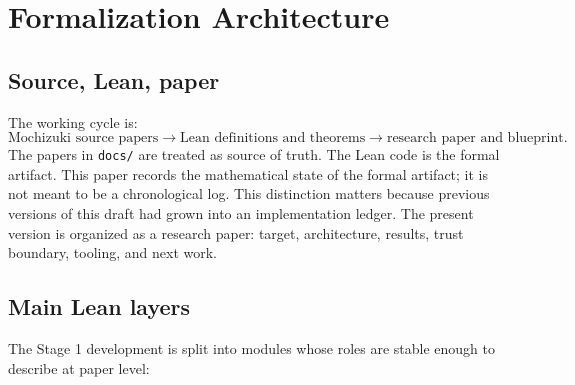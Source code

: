 \documentclass[11pt]{article}
\newcommand{\Lean}{Lean}
\theoremstyle{plain}
\theoremstyle{definition}
\theoremstyle{remark}
\begin{document}
\section{Formalization Architecture}

\subsection{Source, Lean, paper}

The working cycle is:
\[
\text{Mochizuki source papers}
  \longrightarrow
\text{\Lean{} definitions and theorems}
  \longrightarrow
\text{research paper and blueprint}.
\]
The papers in \texttt{docs/} are treated as source of truth.  The Lean code is
the formal artifact.  This paper records the mathematical state of the formal
artifact; it is not meant to be a chronological log.  This distinction matters
because previous versions of this draft had grown into an implementation
ledger.  The present version is organized as a research paper: target,
architecture, results, trust boundary, tooling, and next work.

\subsection{Main Lean layers}

The Stage 1 development is split into modules whose roles are stable enough to
describe at paper level:
\end{document}
